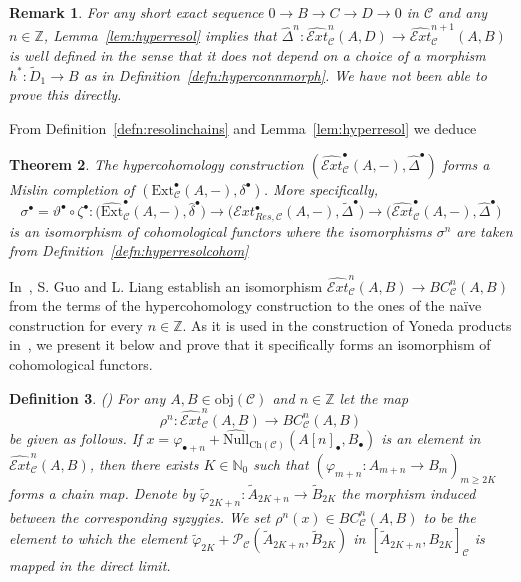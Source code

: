 \documentclass[12pt,a4paper]{article}
\numberwithin{equation}{section}
\newtheorem{thm}{Theorem}[section]
\newtheorem{rem}[thm]{Remark}
\newtheorem{defn}[thm]{Definition}
\theoremstyle{nonumberplain}
\begin{document}
\begin{rem}
For any short exact sequence $0 \rightarrow B \rightarrow C \rightarrow D \rightarrow 0$ in $\mathcal{C}$ and any $n \in \mathbb{Z}$, Lemma~\ref{lem:hyperresol} implies that $\widehat{\Delta}^n: \widehat{\mathcal{E}xt}_{\mathcal{C}}^n(A, D) \rightarrow \widehat{\mathcal{E}xt}_{\mathcal{C}}^{n+1}(A, B)$ is well defined in the sense that it does not depend on a choice of a morphism $h^{\ast}: \widetilde{D}_1 \rightarrow B$ as in Definition~\ref{defn:hyperconnmorph}. We have not been able to prove this directly.
\end{rem}

From Definition~\ref{defn:resolinchains} and Lemma~\ref{lem:hyperresol} we deduce

\begin{thm}\label{thm:hyperresol}
The hypercohomology construction $(\widehat{\mathcal{E}xt}_{\mathcal{C}}^{\bullet}(A, -), \widehat{\Delta}^{\bullet})$ forms a Mislin completion of $(\mathrm{Ext}_{\mathcal{C}}^{\bullet}(A, -), \delta^{\bullet})$. More specifically,
\[ \sigma^{\bullet} = \vartheta^{\bullet} \circ \zeta^{\bullet}: \big(\widehat{\mathrm{Ext}}_{\mathcal{C}}^{\bullet}(A, -), \widehat{\delta}^{\bullet}\big) \rightarrow \big(\mathcal{E}xt_{Res, \mathcal{C}}^{\bullet}(A, -), \widetilde{\Delta}^{\bullet}\big) \rightarrow \big(\widehat{\mathcal{E}xt}_{\mathcal{C}}^{\bullet}(A, -), \widehat{\Delta}^{\bullet}\big) \]
is an isomorphism of cohomological functors where the isomorphisms $\sigma^n$ are taken from Definition~\ref{defn:hyperresolcohom}
\end{thm}

In~\cite[p.~21--22]{guo23}, S.\! Guo and L.\! Liang establish an isomorphism $\widehat{\mathcal{E}xt}_{\mathcal{C}}^n(A, B) \rightarrow BC_{\mathcal{C}}^n(A, B)$ from the terms of the hypercohomology construction to the ones of the naïve construction for every $n \in \mathbb{Z}$. As it is used in the construction of Yoneda products in~\cite[Theorem~6.6]{ghe24}, we present it below and prove that it specifically forms an isomorphism of cohomological functors.

\begin{defn}\label{defn:hypernaive}
(\cite[p.~21--22]{guo23}) For any $A, B \in \mathrm{obj}(\mathcal{C})$ and $n \in \mathbb{Z}$ let the map
\[ \rho^n: \widehat{\mathcal{E}xt}_{\mathcal{C}}^n(A, B) \rightarrow BC_{\mathcal{C}}^n(A, B) \]
be given as follows. If $x = \varphi_{\bullet+n}+\widehat{\mathrm{Null}}_{\mathrm{Ch}(\mathcal{C})}(A[n]_{\bullet}, B_{\bullet})$ is an element in $\widehat{\mathcal{E}xt}_{\mathcal{C}}^n(A, B)$, then there exists $K \in \mathbb{N}_0$ such that $(\varphi_{m+n}: A_{m+n} \rightarrow B_m)_{m \geq 2K}$ forms a chain map. Denote by $\widetilde{\varphi}_{2K+n}: \widetilde{A}_{2K+n} \rightarrow \widetilde{B}_{2K}$ the morphism induced between the corresponding syzygies. We set $\rho^n(x) \in BC_{\mathcal{C}}^n(A, B)$ to be the element to which the element $\widetilde{\varphi}_{2K}+\mathcal{P}_{\mathcal{C}}(\widetilde{A}_{2K+n}, \widetilde{B}_{2K})$ in $[\widetilde{A}_{2K+n}, B_{2K}]_{\mathcal{C}}$ is mapped in the direct limit.
\end{defn}
\end{document}
